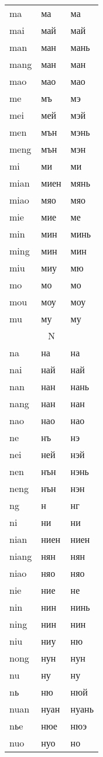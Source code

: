 \begin{longtable}{|l|l|l|}
ma &ма &ма
\\mai &май &май
\\man &ман &мань
\\mang &ман &ман
\\mao &мао &мао
\\me &мъ &мэ
\\mei &мей &мэй
\\men &мън &мэнь
\\meng &мън &мэн
\\mi &ми &ми
\\mian &миен &мянь
\\miao &мяо &мяо
\\mie &мие &ме
\\min &мин &минь
\\ming &мин &мин
\\miu &миу &мю
\\mo &мо &мо
\\mou &моу &моу
\\mu &му &му
\\

\hline

\multicolumn{3}{|c|}{N} \\ \hline

na &на &на
\\nai &най &най
\\nan &нан &нань
\\nang &нан &нан
\\nao &нао &нао
\\ne &нъ &нэ
\\nei &ней &нэй
\\nen &нън &нэнь
\\neng &нън &нэн
\\ng &н &нг
\\ni &ни &ни
\\nian &ниен&ниен
\\niang &нян &нян
\\niao &няо &няо
\\nie &ние &не
\\nin &нин &нинь
\\ning &нин &нин
\\niu &ниу &ню
\\nong &нун &нун
\\nu &ну &ну
\\nь &ню &нюй
\\nuan &нуан &нуань
\\nьe &нюе &нюэ
\\nuo &нуо &но
\\


\end{longtable}
